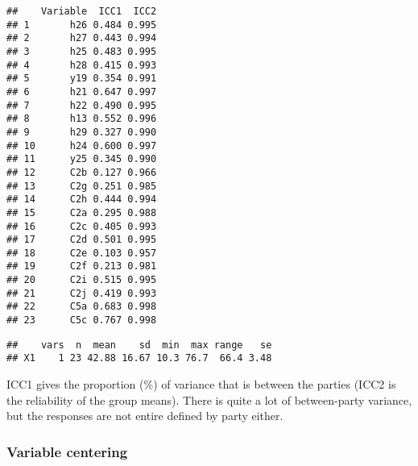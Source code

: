 \documentclass[
]{article}
\newenvironment{Shaded}{\begin{snugshade}}{\end{snugshade}}
\newcommand{\CommentTok}[1]{\textcolor[rgb]{0.56,0.35,0.01}{\textit{#1}}}
\newcommand{\DataTypeTok}[1]{\textcolor[rgb]{0.13,0.29,0.53}{#1}}
\newcommand{\DecValTok}[1]{\textcolor[rgb]{0.00,0.00,0.81}{#1}}
\newcommand{\KeywordTok}[1]{\textcolor[rgb]{0.13,0.29,0.53}{\textbf{#1}}}
\newcommand{\NormalTok}[1]{#1}
\newcommand{\OperatorTok}[1]{\textcolor[rgb]{0.81,0.36,0.00}{\textbf{#1}}}
\newcommand{\StringTok}[1]{\textcolor[rgb]{0.31,0.60,0.02}{#1}}
\begin{document}
\begin{verbatim}
##    Variable  ICC1  ICC2
## 1       h26 0.484 0.995
## 2       h27 0.443 0.994
## 3       h25 0.483 0.995
## 4       h28 0.415 0.993
## 5       y19 0.354 0.991
## 6       h21 0.647 0.997
## 7       h22 0.490 0.995
## 8       h13 0.552 0.996
## 9       h29 0.327 0.990
## 10      h24 0.600 0.997
## 11      y25 0.345 0.990
## 12      C2b 0.127 0.966
## 13      C2g 0.251 0.985
## 14      C2h 0.444 0.994
## 15      C2a 0.295 0.988
## 16      C2c 0.405 0.993
## 17      C2d 0.501 0.995
## 18      C2e 0.103 0.957
## 19      C2f 0.213 0.981
## 20      C2i 0.515 0.995
## 21      C2j 0.419 0.993
## 22      C5a 0.683 0.998
## 23      C5c 0.767 0.998
\end{verbatim}

\begin{Shaded}
\end{Shaded}

\begin{verbatim}
##    vars  n  mean    sd  min  max range   se
## X1    1 23 42.88 16.67 10.3 76.7  66.4 3.48
\end{verbatim}

\begin{Shaded}
\end{Shaded}

ICC1 gives the proportion (\%) of variance that is between the parties
(ICC2 is the reliability of the group means). There is quite a lot of
between-party variance, but the responses are not entire defined by
party either.

\newpage

\hypertarget{variable-centering}{%
\subsubsection{Variable centering}\label{variable-centering}}
\end{document}
